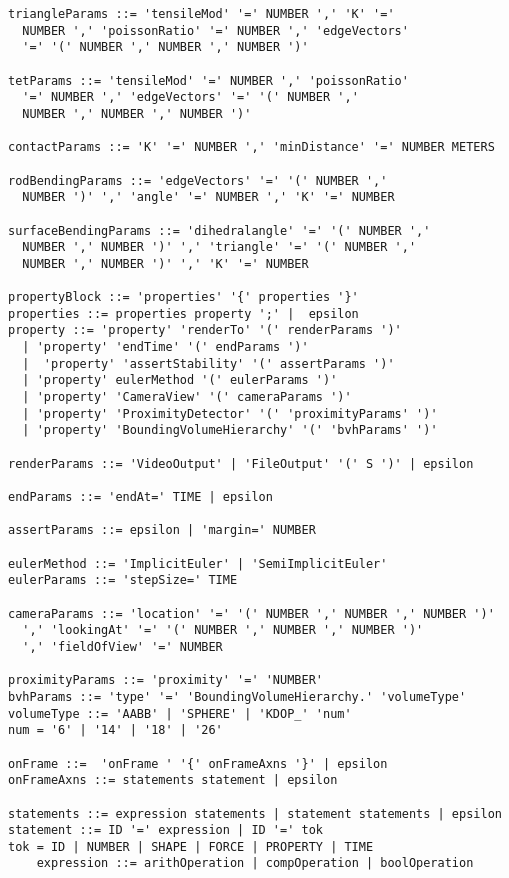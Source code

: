 \documentclass[letterpaper]{article}
\begin{document}
\begin{verbatim}
triangleParams ::= 'tensileMod' '=' NUMBER ',' 'K' '=' 
  NUMBER ',' 'poissonRatio' '=' NUMBER ',' 'edgeVectors' 
  '=' '(' NUMBER ',' NUMBER ',' NUMBER ')'

tetParams ::= 'tensileMod' '=' NUMBER ',' 'poissonRatio' 
  '=' NUMBER ',' 'edgeVectors' '=' '(' NUMBER ',' 
  NUMBER ',' NUMBER ',' NUMBER ')'

contactParams ::= 'K' '=' NUMBER ',' 'minDistance' '=' NUMBER METERS

rodBendingParams ::= 'edgeVectors' '=' '(' NUMBER ',' 
  NUMBER ')' ',' 'angle' '=' NUMBER ',' 'K' '=' NUMBER

surfaceBendingParams ::= 'dihedralangle' '=' '(' NUMBER ',' 
  NUMBER ',' NUMBER ')' ',' 'triangle' '=' '(' NUMBER ',' 
  NUMBER ',' NUMBER ')' ',' 'K' '=' NUMBER

propertyBlock ::= 'properties' '{' properties '}'
properties ::= properties property ';' |  epsilon
property ::= 'property' 'renderTo' '(' renderParams ')' 
  | 'property' 'endTime' '(' endParams ')' 
  |  'property' 'assertStability' '(' assertParams ')' 
  | 'property' eulerMethod '(' eulerParams ')' 
  | 'property' 'CameraView' '(' cameraParams ')' 
  | 'property' 'ProximityDetector' '(' 'proximityParams' ')' 
  | 'property' 'BoundingVolumeHierarchy' '(' 'bvhParams' ')'

renderParams ::= 'VideoOutput' | 'FileOutput' '(' S ')' | epsilon

endParams ::= 'endAt=' TIME | epsilon 

assertParams ::= epsilon | 'margin=' NUMBER 

eulerMethod ::= 'ImplicitEuler' | 'SemiImplicitEuler'
eulerParams ::= 'stepSize=' TIME

cameraParams ::= 'location' '=' '(' NUMBER ',' NUMBER ',' NUMBER ')'
  ',' 'lookingAt' '=' '(' NUMBER ',' NUMBER ',' NUMBER ')' 
  ',' 'fieldOfView' '=' NUMBER

proximityParams ::= 'proximity' '=' 'NUMBER'
bvhParams ::= 'type' '=' 'BoundingVolumeHierarchy.' 'volumeType'
volumeType ::= 'AABB' | 'SPHERE' | 'KDOP_' 'num'
num = '6' | '14' | '18' | '26'

onFrame ::=  'onFrame ' '{' onFrameAxns '}' | epsilon
onFrameAxns ::= statements statement | epsilon

statements ::= expression statements | statement statements | epsilon
statement ::= ID '=' expression | ID '=' tok
tok = ID | NUMBER | SHAPE | FORCE | PROPERTY | TIME
	expression ::= arithOperation | compOperation | boolOperation


\end{verbatim}
\end{document}
